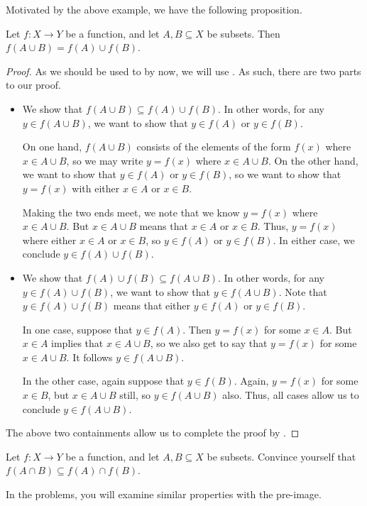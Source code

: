 \documentclass[../notes.tex]{subfiles}
\begin{document}
Motivated by the above example, we have the following proposition.
\begin{proposition}
    Let $f\colon X\to Y$ be a function, and let $A,B\subseteq X$ be subsets. Then $f(A\cup B)=f(A)\cup f(B)$.
\end{proposition}
\begin{proof}
    As we should be used to by now, we will use . As such, there are two parts to our proof.
    \begin{itemize}
        \item We show that $f(A\cup B)\subseteq f(A)\cup f(B)$. In other words, for any $y\in f(A\cup B)$, we want to show that $y\in f(A)$ or $y\in f(B)$.

        On one hand, $f(A\cup B)$ consists of the elements of the form $f(x)$ where $x\in A\cup B$, so we may write $y=f(x)$ where $x\in A\cup B$. On the other hand, we want to show that $y\in f(A)$ or $y\in f(B)$, so we want to show that $y=f(x)$ with either $x\in A$ or $x\in B$.

        Making the two ends meet, we note that we know $y=f(x)$ where $x\in A\cup B$. But $x\in A\cup B$ means that $x\in A$ or $x\in B$. Thus, $y=f(x)$ where either $x\in A$ or $x\in B$, so $y\in f(A)$ or $y\in f(B)$. In either case, we conclude $y\in f(A)\cup f(B)$.

        \item We show that $f(A)\cup f(B)\subseteq f(A\cup B)$. In other words, for any $y\in f(A)\cup f(B)$, we want to show that $y\in f(A\cup B)$. Note that $y\in f(A)\cup f(B)$ means that either $y\in f(A)$ or $y\in f(B)$.

        In one case, suppose that $y\in f(A)$. Then $y=f(x)$ for some $x\in A$. But $x\in A$ implies that $x\in A\cup B$, so we also get to say that $y=f(x)$ for some $x\in A\cup B$. It follows $y\in f(A\cup B)$.

        In the other case, again suppose that $y\in f(B)$. Again, $y=f(x)$ for some $x\in B$, but $x\in A\cup B$ still, so $y\in f(A\cup B)$ also. Thus, all cases allow us to conclude $y\in f(A\cup B)$.
    \end{itemize}
    The above two containments allow us to complete the proof by .
\end{proof}
\begin{exe}
    Let $f\colon X\to Y$ be a function, and let $A,B\subseteq X$ be subsets. Convince yourself that $f(A\cap B)\subseteq 
    f(A)\cap f(B)$.
\end{exe}
In the problems, you will examine similar properties with the pre-image.
\end{document}
